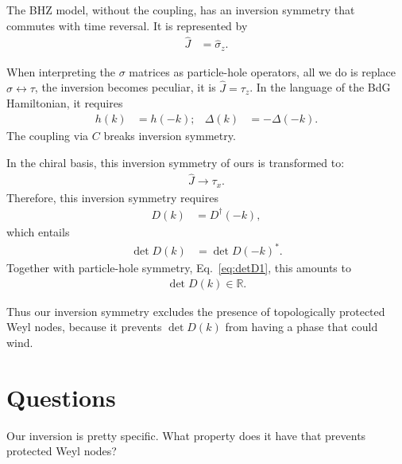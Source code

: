 \documentclass[aps,prb,twocolumn,showpacs,superscriptaddress,10p,longbibliography]{revtex4-1}
\begin{document}
The BHZ model, without the coupling, has an inversion
symmetry that commutes with time reversal. It is represented by
\begin{align}
  \hat{J} &= \hat{\sigma}_z.
\end{align}

When interpreting the $\sigma$ matrices as particle-hole operators,
all we do is replace $\sigma \leftrightarrow \tau$, the inversion
becomes peculiar, it is $\hat{J} =\tau_z$. In the language of the BdG
Hamiltonian, it requires
\begin{align}
  h(k) &= h(-k);&   \Delta(k) &= -\Delta(-k). 
\end{align}
The coupling via $C$ breaks inversion symmetry.

In the chiral basis, this inversion symmetry of ours is transformed to:
\begin{align}
\hat{J} \to \tau_x.
\end{align}
Therefore, this inversion symmetry requires
\begin{align}
  D(k) &= D^\dagger(-k),
\end{align}
which entails
\begin{align}
  \det D(k) &= \det D(-k)^\ast.
\end{align}
Together with particle-hole symmetry, Eq.~\eqref{eq:detD1}, this
amounts to
\begin{align}
  \det D(k) \in \mathbb{R}. 
\end{align}

Thus our inversion symmetry excludes the presence of topologically
protected Weyl nodes, because it prevents $\det D(k)$ from having a
phase that could wind. 

\section{Questions}

Our inversion is pretty specific. What property does it have that
prevents protected Weyl nodes?
\end{document}
